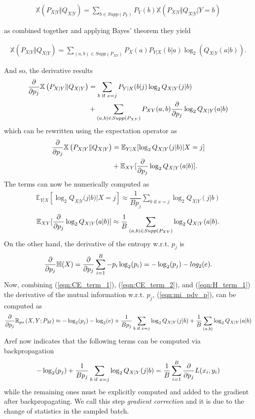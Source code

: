 \begin{align}
	\mathbb{X}\left(P_{X|Y} \Vert Q_{X|Y}\right) = \sum \limits_{b \in Supp(P_Y)} P_Y(b) \mathbb{X}\left( P_{X|Y} \Vert Q_{X|Y} \vert Y=b \right) 
\end{align}

as combined together and applying Bayes' theorem they yield

\begin{align}
\label{eqn:CE_expanded}
	\mathbb{X}\left(P_{X|Y} \Vert Q_{X|Y}\right) = \sum \limits_{(a,b) \in Supp(P_{XY})} P_X(a) P_{Y|X}(b|a) \log_2(Q_{X|Y}(a|b)). 
\end{align}

And so, the derivative results
\begin{align}
	\pdv{p_j} \mathbb{X}\left(P_{X|Y} \Vert Q_{X|Y}\right) &= \sum \limits_{b \text{ if } x=j} P_{Y|X}(b|j) \log_2 Q_{X|Y}(j|b) \\
	& + \sum \limits_{(a,b) \in Supp(P_{XY})} P_{XY}(a, b) \pdv{p_j} \log_2 Q_{X|Y}(a|b)
\end{align}
which can be rewritten using the expectation operator as
\begin{align}
	\pdv{p_j} \mathbb{X}\left(P_{X|Y} \Vert Q_{X|Y}\right) &= \mathbb{E}_{Y|X}[ \log_2 Q_{X|Y}(j|b)| X=j] \\
	& + \mathbb{E}_{XY}[ \pdv{p_j} \log_2 Q_{X|Y}(a|b)].
\end{align}
The terms can now be numerically computed as
\begin{align}
\label{eqn:CE_term_1}
	\mathbb{E}_{Y|X}[ \log_2 Q_{X|Y}(j|b)| X=j] \approx \dfrac{1}{Bp_j}\sum \limits_{b \text{ if } x=j} \log_2 Q_{X|Y}(j|b)
\end{align}
\begin{align}
\label{eqn:CE_term_2}
	\mathbb{E}_{XY}[ \pdv{p_j} \log_2 Q_{X|Y}(a|b)] \approx \dfrac{1}{B} \sum \limits_{(a,b) \in Supp(P_{XY})} \log_2 Q_{X|Y}(a|b).
\end{align}
On the other hand, the derivative of the entropy w.r.t. $p_j$ is
\begin{align}
\label{eqn:H_term_1}
	\pdv{p_j} \mathbb{H}(X) = \pdv{p_j} \sum \limits_{i = 1}^{B} - p_i \log_2(p_i) = - \log_2 (p_j) - log_2 (e).
\end{align}
Now, combining (\ref{eqn:CE_term_1}), (\ref{eqn:CE_term_2}), and (\ref{eqn:H_term_1}) the derivative of the mutual information w.r.t. $p_j$, (\ref{eqn:mi_pdv_p}), can be computed as
\begin{align}
	\pdv{p_j} \mathbb{R}_{ps} \left(X , Y ; P_M \right) \approx - \log_2 (p_j) - \log_2 (e) + \dfrac{1}{Bp_j}\sum \limits_{b \text{ if } x=j} \log_2 Q_{X|Y}(j|b) + \dfrac{1}{B} \sum \limits_{(a,b)} \log_2 Q_{X|Y}(a|b)
\end{align}
Aref now indicates that the following terms can be computed via backpropagation
\begin{align}
	- \log_2 (p_j) + \dfrac{1}{Bp_j}\sum \limits_{b \text{ if } x=j} \log_2 Q_{X|Y}(j|b) = \dfrac{1}{B} \sum \limits_{i = 1}^{B} \pdv{p_j} L(x_i, y_i)
\end{align}
while the remaining ones must be explicitly computed and added to the gradient after backpropagating. We call this step \textit{gradient correction} and it is due to the change of statistics in the sampled batch.
